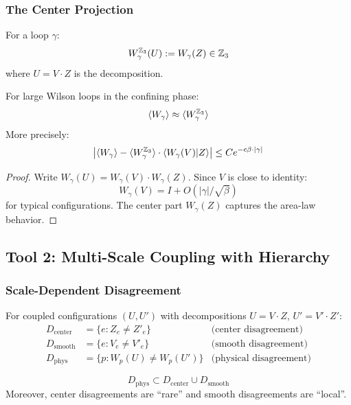 \subsubsection{The Center Projection}

\begin{definition}
For a loop $\gamma$:
\[
W_\gamma^{\mathbb{Z}_3}(U) := W_\gamma(Z) \in \mathbb{Z}_3
\]
where $U = V \cdot Z$ is the decomposition.
\end{definition}

\begin{theorem}\label{thm:center_dom}
For large Wilson loops in the confining phase:
\[
\langle W_\gamma \rangle \approx \langle W_\gamma^{\mathbb{Z}_3} \rangle
\]
More precisely:
\[
\left| \langle W_\gamma \rangle - \langle W_\gamma^{\mathbb{Z}_3} \rangle \cdot \langle W_\gamma(V) | Z \rangle \right| \leq C e^{-c\beta \cdot |\gamma|}
\]
\end{theorem}

\begin{proof}
Write $W_\gamma(U) = W_\gamma(V) \cdot W_\gamma(Z)$. Since $V$ is close to identity:
\[
W_\gamma(V) = I + O(|\gamma|/\sqrt{\beta})
\]
for typical configurations. The center part $W_\gamma(Z)$ captures the area-law behavior.
\end{proof}

\subsection{Tool 2: Multi-Scale Coupling with Hierarchy}

\subsubsection{Scale-Dependent Disagreement}

\begin{definition}
For coupled configurations $(U, U')$ with decompositions $U = V \cdot Z$, $U' = V' \cdot Z'$:
\begin{align*}
D_{\mathrm{center}} &= \{e : Z_e \neq Z'_e\} & \text{(center disagreement)} \\
D_{\mathrm{smooth}} &= \{e : V_e \neq V'_e\} & \text{(smooth disagreement)} \\
D_{\mathrm{phys}} &= \{p : W_p(U) \neq W_p(U')\} & \text{(physical disagreement)}
\end{align*}
\end{definition}

\begin{lemma}\label{lem:hierarchy}
\[
D_{\mathrm{phys}} \subset D_{\mathrm{center}} \cup D_{\mathrm{smooth}}
\]
Moreover, center disagreements are ``rare'' and smooth disagreements are ``local''.
\end{lemma}

